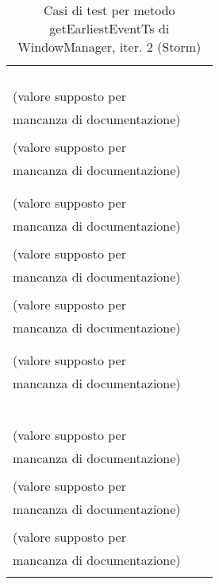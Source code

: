 \documentclass[10pt, a4paper]{article}
\newcommand{\Intmaketable}[4]{
	\begin{longtable}{#3}
	#4
	\caption{#2}
	\label{#1}
	\end{longtable}
}
\newcommand{\Inttestctable}[3]{
	\Intmaketable{#1}{#2}{|l|l|l|}{
	\hline
	\thead{Input} & \thead{Esito atteso} & \thead{Motivazione}\\
	\hline
	\hline
	#3
	\hline}
}
\newcommand{\Inttestccaption}[4]{Casi di test per metodo #1 di #2, iter. #3 (#4)}
\newcommand{\gettablelabel}[5]{table:#1:#2:#3:iter#4:proj#5}
\newcommand{\testctable}[5]{
	\Inttestctable{\gettablelabel{testc}{#1}{#2}{#3}{#4}}
		{\Inttestccaption{#1}{#2}{#3}{#4}}
		{#5}
}
\newcommand{\tcell}{\makecell[tl]}
\newcommand{\newtrow}{\\ \hline}
\def\storm{Storm}
\begin{document}
	\testctable{getEarliestEventTs}{WindowManager}{2}{\storm}{
			\tcell{$-1,-1$} &
			\tcell{IllegalArgumentException viene lanciata} &
			\tcell{startTs < 0 e endTs < 0}
		\newtrow
			\tcell{$-1,0$} &
			\tcell{IllegalArgumentException viene lanciata} &
			\tcell{startTs < 0}
		\newtrow
			\tcell{$-1,-2$} &
			\tcell{IllegalArgumentException viene lanciata} &
			\tcell{startTs < 0 e endTs < 0}
		\newtrow
			\tcell{$0,0$} &
			\tcell{Ritorno $-1$} &
			\tcell{Nessun evento nel range\\(valore supposto per\\ mancanza di documentazione)}
		\newtrow
			\tcell{$0,1$} &
			\tcell{Ritorno $-1$} &
			\tcell{Nessun evento nel range\\(valore supposto per\\ mancanza di documentazione)}
		\newtrow
			\tcell{$0,-1$} &
			\tcell{IllegalArgumentException viene lanciata} &
			\tcell{endTs < 0}
		\newtrow
			\tcell{$t(e_1),t(e_1)$} &
			\tcell{Ritorno $-1$} &
			\tcell{Nessun evento nel range\\(valore supposto per\\ mancanza di documentazione)}
		\newtrow
			\tcell{$t(e_1),t(e_1)+1$} &
			\tcell{Ritorno $-1$} &
			\tcell{Nessun evento nel range\\(valore supposto per\\ mancanza di documentazione)}
		\newtrow
			\tcell{$t(e_1),t(e_1)-1$} &
			\tcell{Ritorno $-1$} &
			\tcell{Nessun evento nel range\\(valore supposto per\\ mancanza di documentazione)}
		\newtrow
			\tcell{$t(e_1)-100, t(e_2)$} &
			\tcell{Ritorno $t(e_1)$} &
			\tcell{}
		\newtrow
			\tcell{$t(e_1), t(e_1)+100$} &
			\tcell{Ritorno $-1$} &
			\tcell{Nessun evento nel range\\(valore supposto per\\ mancanza di documentazione)}
		\newtrow
			\tcell{$t(e_1), t(e_2)$} &
			\tcell{Ritorno $t(e_2)$} &
			\tcell{}
		\newtrow
			\tcell{$t(e_1), t(e_3)$} &
			\tcell{Ritorno $t(e_2)$} &
			\tcell{}
		\newtrow
			\tcell{$t(e_2), t(e_7)$} &
			\tcell{Ritorno $t(e_3)$} &
			\tcell{}
		\newtrow
			\tcell{$t(e_{10})-100, t(e_{10})+100$} &
			\tcell{Ritorno $t(e_{10})$} &
			\tcell{}
		\newtrow
			\tcell{$t(e_1)-100, t(e_{10})+100$} &
			\tcell{Ritorno $t(e_1)$} &
			\tcell{}
		\newtrow
			\tcell{$t(e_{10}), t(e_{10})+100$} &
			\tcell{Ritorno $-1$} &
			\tcell{Nessun evento nel range\\(valore supposto per\\ mancanza di documentazione)}
		\newtrow
			\tcell{$t(e_1)-200, t(e_1)-100$} &
			\tcell{Ritorno $-1$} &
			\tcell{Nessun evento nel range\\(valore supposto per\\ mancanza di documentazione)}
		\newtrow
			\tcell{$t(e_{10})+100, t(e_{10})+200$} &
			\tcell{Ritorno $-1$} &
			\tcell{Nessun evento nel range\\(valore supposto per\\ mancanza di documentazione)}
		\newtrow
	}
	
\end{document}

